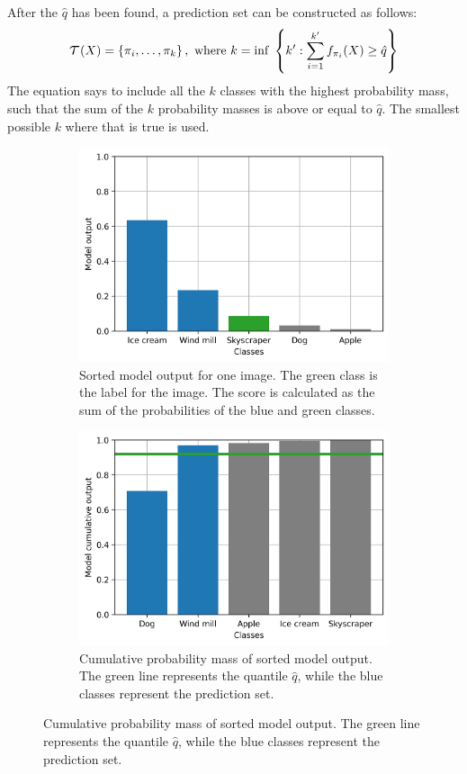 After the $\hat{q}$ has been found, a prediction set can be constructed as follows:
\begin{align*}
    \Tau(X) = \left\{ \pi_i, \ldots, \pi_k \right\}, ~\text{where}~ k = \text{inf}~ \left\{k' : \sum^{k'}_{i=1} f_{\pi_i}(X) \geq \hat{q} \right\}
\end{align*}
The equation says to include all the $k$ classes with the highest probability mass, such that the sum of the $k$ probability masses is above or equal to $\hat{q}$. The smallest possible $k$ where that is true is used.


\begin{figure}
    \centering
    \begin{subfigure}{0.44\textwidth}
        \includegraphics[width=\textwidth]{Images/adaptive-prediction-sets-score.png}
        \caption{Sorted model output for one image. The green class is the label for the image. The score is calculated as the sum of the probabilities of the blue and green classes.}
    \end{subfigure}
    \hspace{1em}
    \begin{subfigure}{0.44\textwidth}
        \includegraphics[width=\textwidth]{Images/adaptive-prediction-sets-prediction.png}
        \caption{Cumulative probability mass of sorted model output. The green line represents the quantile $\hat{q}$, while the blue classes represent the prediction set.}
    \end{subfigure}


\end{figure}
